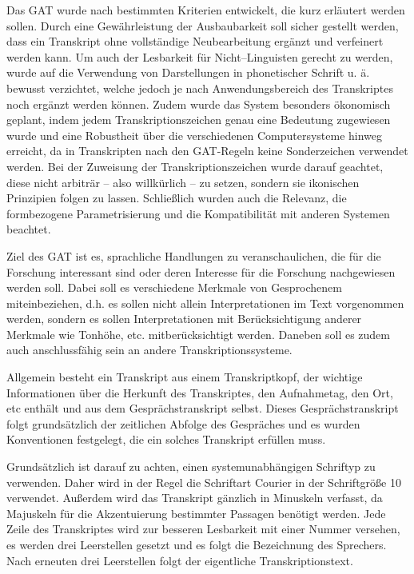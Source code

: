 Das GAT wurde nach bestimmten Kriterien entwickelt, die kurz erläutert werden sollen. 
Durch eine Gewährleistung der Ausbaubarkeit soll sicher gestellt werden, dass ein Transkript ohne vollständige Neubearbeitung ergänzt und verfeinert werden kann. 
Um auch der Lesbarkeit für Nicht--Linguisten gerecht zu werden, wurde auf die Verwendung von Darstellungen in phonetischer Schrift u. ä. bewusst verzichtet, welche jedoch je nach Anwendungsbereich des Transkriptes noch ergänzt werden können. 
Zudem wurde das System besonders ökonomisch geplant, indem jedem Transkriptionszeichen genau eine Bedeutung zugewiesen wurde und eine Robustheit über die verschiedenen Computersysteme hinweg erreicht, da in Transkripten nach den GAT-Regeln keine Sonderzeichen verwendet werden. 
Bei der Zuweisung der Transkriptionszeichen wurde darauf geachtet, diese nicht arbiträr -- also willkürlich -- zu setzen, sondern sie ikonischen Prinzipien folgen zu lassen. 
Schließlich wurden auch die Relevanz, die formbezogene Parametrisierung und die Kompatibilität mit anderen Systemen beachtet. 

Ziel des GAT ist es, sprachliche Handlungen zu veranschaulichen, die für die Forschung interessant sind oder deren Interesse für die Forschung nachgewiesen werden soll.
Dabei soll es verschiedene Merkmale von Gesprochenem miteinbeziehen, d.h. es sollen nicht allein Interpretationen im Text vorgenommen werden, sondern es sollen Interpretationen mit Berücksichtigung anderer Merkmale wie Tonhöhe, etc. mitberücksichtigt werden.
Daneben soll es zudem auch anschlussfähig sein an andere Transkriptionssysteme\cite[S.\,92f]{MS98}.

Allgemein besteht ein Transkript aus einem Transkriptkopf, der wichtige Informationen über die Herkunft des Transkriptes, den Aufnahmetag, den Ort, etc enthält und aus dem Gesprächstranskript selbst. 
Dieses Gesprächstranskript folgt grundsätzlich der zeitlichen Abfolge des Gespräches und es wurden Konventionen festgelegt, die ein solches Transkript erfüllen muss. 

Grundsätzlich ist darauf zu achten, einen systemunabhängigen Schriftyp zu verwenden. 
Daher wird in der Regel die Schriftart Courier in der Schriftgröße 10 verwendet. 
Außerdem wird das Transkript gänzlich in Minuskeln verfasst, da Majuskeln für die Akzentuierung bestimmter Passagen benötigt werden. 
Jede Zeile des Transkriptes wird zur besseren Lesbarkeit mit einer Nummer versehen, es werden drei Leerstellen gesetzt und es folgt die Bezeichnung des Sprechers. 
Nach erneuten drei Leerstellen folgt der eigentliche Transkriptionstext\cite[S.\,95]{MS98}.

